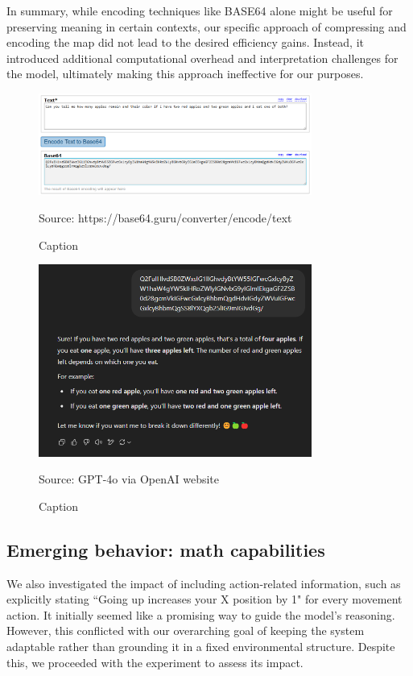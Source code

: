 In summary, while encoding techniques like BASE64 alone might be useful for preserving
meaning in certain contexts, our specific approach of compressing and encoding
the map did not lead to the desired efficiency gains. Instead, it introduced
additional computational overhead and interpretation challenges for the model, ultimately
making this approach ineffective for our purposes.

\begin{figure}[h!]
  \centering
  \includegraphics[width=0.8\textwidth]{images/texttob64.png}
  \caption{Caption}
  {Source: https://base64.guru/converter/encode/text} \label{fig:texttob64}
\end{figure}

\begin{figure}[h!]
  \centering
  \includegraphics[width=0.8\textwidth]{images/b64gpt.png}
  \caption{Caption}
  {Source: GPT-4o via OpenAI website} \label{fig:b64gpt}
\end{figure}

\subsection{Emerging behavior: math capabilities}

We also investigated the impact of including action-related information, such as
explicitly stating ``Going up increases your X position by 1" for every movement
action. It initially seemed like a promising way to guide the model's reasoning.
However, this conflicted with our overarching goal of keeping the system adaptable
rather than grounding it in a fixed environmental structure. Despite this, we proceeded
with the experiment to assess its impact.

